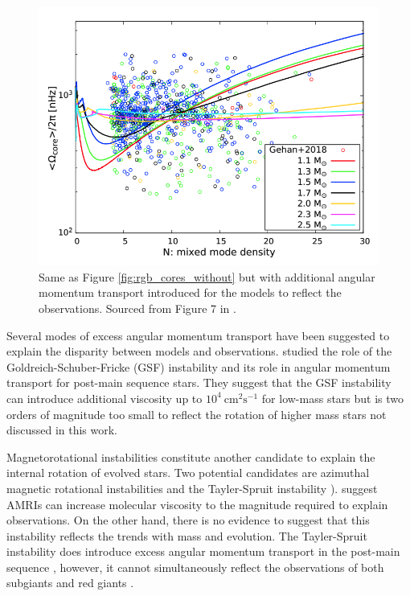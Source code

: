 \begin{figure}[h]
    \includegraphics[width=\textwidth]{Figures/intro_figures/rgb_core_rot.png}
    \caption[Average core rotation rates of red giants against mixed mode density without additional angular momentum transport]{Same as Figure \ref{fig:rgb_cores_without} but with additional angular momentum transport introduced for the models to reflect the observations.
    Sourced from Figure 7 in \citep{moyano_asteroseismology_2022}.}
    \label{fig:rgb_cores_with}
\end{figure}


Several modes of excess angular momentum transport have been suggested to explain the disparity between models and observations.
\citet{barker_angular_2019,barker_angular_2020} studied the role of
the Goldreich-Schuber-Fricke (GSF) instability \citep{goldreich_differential_1967,fricke_rotation_1967} and its role in angular momentum transport for post-main sequence stars.
They suggest that the GSF instability can introduce additional viscosity up to $10^4 \ \text{cm}^2 \text{s}^{-1}$ for low-mass stars but is two orders of magnitude too small to reflect the rotation of higher mass stars not discussed in this work.

Magnetorotational instabilities constitute another candidate to explain the internal rotation of evolved stars.
Two potential candidates are azimuthal magnetic rotational instabilities  and the Tayler-Spruit instability \citep[see ][]{spruit_dynamo_2002}).
\citet{rudiger_diffusive_2015} suggest AMRIs can increase molecular viscosity to the magnitude required to explain observations.
On the other hand, there is no evidence to suggest that this instability reflects the trends with mass and evolution.
The Tayler-Spruit instability does introduce excess angular momentum transport in the post-main sequence \citep{fuller_slowing_2019}, however, it cannot simultaneously reflect the observations of both subgiants and red giants \citep{eggenberger_asteroseismology_2019,den_hartogh_constraining_2019}.


